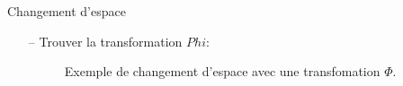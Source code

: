 \documentclass[9pt]{beamer}
\begin{document}
	\begin{frame}{Changement d'espace}
		\begin{itemize}
			\item[--] Trouver la transformation $Phi$:
			\begin{figure}[H]
				{
					\caption{\label{fig::kernel_a_la_mano}  Exemple de changement d'espace avec une transfomation $\Phi$.}
				}
			\end{figure}
		\end{itemize}
	\end{frame}
\end{document}
